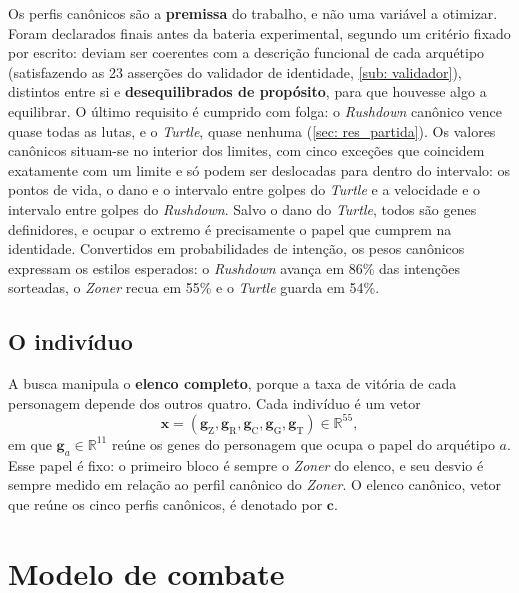Os perfis canônicos são a \textbf{premissa} do trabalho, e não uma variável a otimizar. Foram declarados finais antes da bateria experimental, segundo um critério fixado por escrito: deviam ser coerentes com a descrição funcional de cada arquétipo (satisfazendo as 23 asserções do validador de identidade, \autoref{sub: validador}), distintos entre si e \textbf{desequilibrados de propósito}, para que houvesse algo a equilibrar. O último requisito é cumprido com folga: o \textit{Rushdown} canônico vence quase todas as lutas, e o \textit{Turtle}, quase nenhuma (\autoref{sec: res_partida}). Os valores canônicos situam-se no interior dos limites, com cinco exceções que coincidem exatamente com um limite e só podem ser deslocadas para dentro do intervalo: os pontos de vida, o dano e o intervalo entre golpes do \textit{Turtle} e a velocidade e o intervalo entre golpes do \textit{Rushdown}. Salvo o dano do \textit{Turtle}, todos são genes definidores, e ocupar o extremo é precisamente o papel que cumprem na identidade. Convertidos em probabilidades de intenção, os pesos canônicos expressam os estilos esperados: o \textit{Rushdown} avança em 86\% das intenções sorteadas, o \textit{Zoner} recua em 55\% e o \textit{Turtle} guarda em 54\%.

\subsection{O indivíduo}
\label{sub: individuo}

A busca manipula o \textbf{elenco completo}, porque a taxa de vitória de cada personagem depende dos outros quatro. Cada indivíduo é um vetor
\begin{equation}
    \label{eq: individuo}
    \mathbf{x} = \left(\mathbf{g}_{\mathrm{Z}}, \mathbf{g}_{\mathrm{R}}, \mathbf{g}_{\mathrm{C}}, \mathbf{g}_{\mathrm{G}}, \mathbf{g}_{\mathrm{T}}\right) \in \mathbb{R}^{55},
\end{equation}
em que $\mathbf{g}_a \in \mathbb{R}^{11}$ reúne os genes do personagem que ocupa o papel do arquétipo $a$. Esse papel é fixo: o primeiro bloco é sempre o \textit{Zoner} do elenco, e seu desvio é sempre medido em relação ao perfil canônico do \textit{Zoner}. O elenco canônico, vetor que reúne os cinco perfis canônicos, é denotado por $\mathbf{c}$.

\section{Modelo de combate}
\label{sec: combate}

